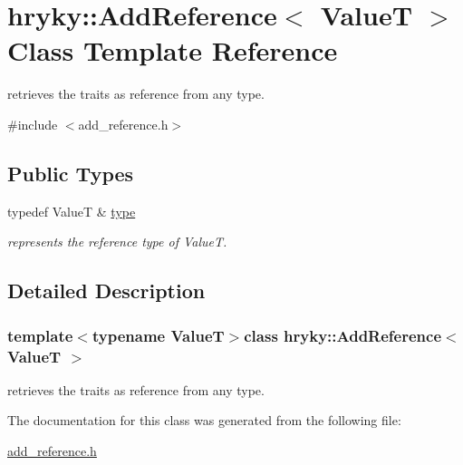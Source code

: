 \hypertarget{classhryky_1_1_add_reference}{\section{hryky\-:\-:Add\-Reference$<$ Value\-T $>$ Class Template Reference}
\label{classhryky_1_1_add_reference}
}


retrieves the traits as reference from any type.  




{\ttfamily \#include $<$add\-\_\-reference.\-h$>$}

\subsection*{Public Types}
\begin{DoxyCompactItemize}
\item 
\hypertarget{classhryky_1_1_add_reference_a4b90c1381625432ba6152b7388bc4399}{typedef Value\-T \& \hyperlink{classhryky_1_1_add_reference_a4b90c1381625432ba6152b7388bc4399}{type}}\label{classhryky_1_1_add_reference_a4b90c1381625432ba6152b7388bc4399}

\begin{DoxyCompactList}\small\item\em represents the reference type of Value\-T. \end{DoxyCompactList}\end{DoxyCompactItemize}


\subsection{Detailed Description}
\subsubsection*{template$<$typename Value\-T$>$class hryky\-::\-Add\-Reference$<$ Value\-T $>$}

retrieves the traits as reference from any type. 

The documentation for this class was generated from the following file\-:\begin{DoxyCompactItemize}
\item 
\hyperlink{add__reference_8h}{add\-\_\-reference.\-h}\end{DoxyCompactItemize}
